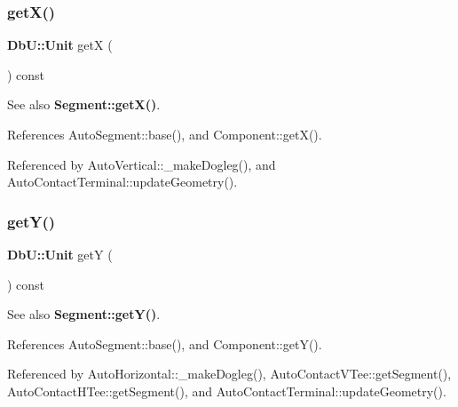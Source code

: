 \subsubsection{\texorpdfstring{get\+X()}{getX()}}
{\footnotesize\ttfamily \textbf{ Db\+U\+::\+Unit} getX (\begin{DoxyParamCaption}{ }\end{DoxyParamCaption}) const\hspace{0.3cm}{\ttfamily [virtual]}}

\begin{DoxySeeAlso}{See also}
\textbf{ Segment\+::get\+X()}. 
\end{DoxySeeAlso}


References Auto\+Segment\+::base(), and Component\+::get\+X().



Referenced by Auto\+Vertical\+::\+\_\+make\+Dogleg(), and Auto\+Contact\+Terminal\+::update\+Geometry().

\mbox{\label{classKatabatic_1_1AutoSegment_a4580de6b074712e400d5d238ce3af054}} 
\subsubsection{\texorpdfstring{get\+Y()}{getY()}}
{\footnotesize\ttfamily \textbf{ Db\+U\+::\+Unit} getY (\begin{DoxyParamCaption}{ }\end{DoxyParamCaption}) const\hspace{0.3cm}{\ttfamily [virtual]}}

\begin{DoxySeeAlso}{See also}
\textbf{ Segment\+::get\+Y()}. 
\end{DoxySeeAlso}


References Auto\+Segment\+::base(), and Component\+::get\+Y().



Referenced by Auto\+Horizontal\+::\+\_\+make\+Dogleg(), Auto\+Contact\+V\+Tee\+::get\+Segment(), Auto\+Contact\+H\+Tee\+::get\+Segment(), and Auto\+Contact\+Terminal\+::update\+Geometry().

\mbox{\label{classKatabatic_1_1AutoSegment_a9c63fe7288748eaf5332ca796a36d872}} 
